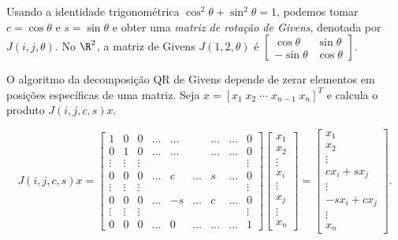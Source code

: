 \documentclass{article}
\begin{document}
Usando a identidade trigonométrica \(\cos^2 \theta + \sin^2 \theta = 1\), podemos tomar \(c=\cos \theta\) e \(s=\sin \theta\) e obter uma \emph{matriz de rotação de Givens}, denotada por \(J(i,j,\theta)\). No \(\R^2\), a matriz de Givens \(J(1,2,\theta)\) é \(\begin{bmatrix} \cos \theta & \sin \theta \\ -\sin \theta & \cos \theta \end{bmatrix}\).

O algoritmo da decomposição QR de Givens depende de zerar elementos em posições específicas de uma matriz. Seja \(x = [x_1 \; x_2 \; \cdots \; x_{n-1} \; x_n]^T\) e calcula o produto \(J(i,j,c,s)x\).

\begin{equation} \label{eq:produto_givens_vetor}
    J(i,j,c,s)x = \begin{bmatrix} 
        1 & 0 & 0 & \ldots & \ldots & & \ldots & \ldots & 0 \\ 
        0 & 1 & 0 & \ldots & \ldots & & \ldots & \ldots & 0 \\ 
        \vdots & \vdots & \vdots & & & & & & \vdots \\ 
        0 & 0 & 0 & \ldots & c & \ldots & s & \ldots & 0 \\ 
        \vdots & \vdots & \vdots & & & & & & \vdots \\ 
        0 & 0 & 0 & \ldots & -s & \ldots & c & \ldots & 0 \\ 
        \vdots & \vdots & \vdots & & & & & & \vdots \\ 
        0 & 0 & 0 & \ldots & 0 & \ldots & \ldots & \ldots & 1 
    \end{bmatrix}
    \begin{bmatrix} x_1 \\ x_2 \\ \vdots \\ x_{i} \\ \vdots \\ x_{j} \\ \vdots \\ x_n 
    \end{bmatrix} 
    = 
    \begin{bmatrix} x_1 \\ x_2 \\ \vdots \\ cx_i + sx_j \\ \vdots \\ -sx_i + cx_j \\ \vdots \\ x_n 
    \end{bmatrix}.
\end{equation}
\end{document}
